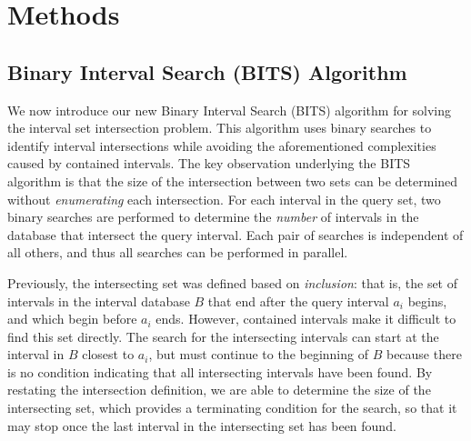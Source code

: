 \documentclass{bioinfo}
\begin{document}
	



	\section{Methods}
	
	\subsection{Binary Interval Search (BITS) Algorithm}
	We now introduce our new Binary Interval Search (BITS) algorithm for solving
	the interval set intersection problem.  This algorithm uses binary searches
	to identify interval intersections while avoiding the aforementioned
	complexities caused by contained intervals. The key observation underlying the BITS 
	algorithm is that the size of the intersection between two sets can be 
	determined without \emph{enumerating} each intersection.  For each interval 
	in the query set, two binary searches are performed to determine the \emph{number} 
	of intervals in the database that intersect the query interval.  Each pair of
	searches is independent of all others, and thus all searches can be
	performed in parallel.  
	
	Previously, the intersecting set was defined based on \emph{inclusion}:
	that is, the set of intervals in the interval database $B$ that end after the query
	interval $a_i$ begins, and which begin before $a_i$ ends.  However,
	contained intervals make it difficult to find this set directly.  The
	search for the intersecting intervals can start at the interval in $B$
	closest to $a_i$, but must continue to the beginning of $B$ because
	there is no condition indicating that all intersecting intervals have
	been found.  By restating the intersection definition, we are able to
	determine the size of the intersecting set, which provides a
	terminating condition for the search, so that it may stop once the
	last interval in the intersecting set has been found.
\end{document}
